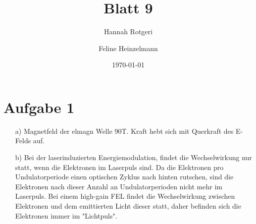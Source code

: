 \documentclass[11pt,a4paper]{article}
\title{Blatt 9}
\date{\today}
\author{Hannah Rotgeri \and Feline Heinzelmann}
\begin{document}
    \maketitle

    \section*{Aufgabe 1}
	\begin{itemize}
		\item[a)] 
			Magnetfeld der elmagn Welle 90T. 
			Kraft hebt sich mit Querkraft des E-Felds auf.
			
		\item[b)]
			Bei der laserinduzierten Energiemodulation, findet die Wechselwirkung nur statt,
			wenn die Elektronen im Laserpuls sind. 
			Da die Elektronen pro Undulatorperiode einen optischen Zyklus nach hinten rutschen,
			sind die Elektronen nach dieser Anzahl an Undulatorperioden nicht mehr im Laserpuls.
			Bei einem high-gain FEL findet die Wechselwirkung zwischen Elektronen und dem emittierten Licht dieser statt,
			daher befinden sich die Elektronen immer im "Lichtpuls".

	\end{itemize}


	
\end{document}

